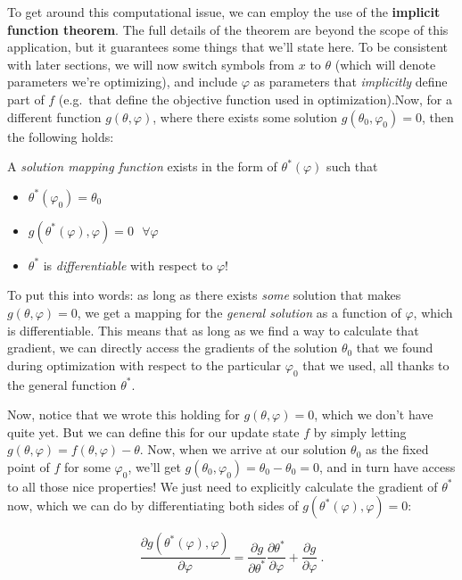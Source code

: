 \documentclass[
  11pt,
  numbers=noendperiod]{book}
\providecommand{\tightlist}{%
  \setlength{\itemsep}{0pt}\setlength{\parskip}{0pt}}\usepackage{longtable,booktabs,array}
\begin{document}
To get around this computational issue, we can employ the use of the
\textbf{implicit function theorem}. The full details of the theorem are
beyond the scope of this application, but it guarantees some things that
we'll state here. To be consistent with later sections, we will now
switch symbols from \(x\) to \(\theta\) (which will denote parameters
we're optimizing), and include \(\varphi\) as parameters that
\emph{implicitly} define part of \(f\) (e.g.~that define the objective
function used in optimization).Now, for a different function
\(g(\theta, \varphi)\), where there exists some solution
\(g(\theta_0, \varphi_0) = 0\), then the following holds:

A \emph{solution mapping function} exists in the form of
\(\theta^*(\varphi)\) such that

\begin{itemize}
\tightlist
\item
  \(\theta^*(\varphi_0) = \theta_0\)
\item
  \(g(\theta^*(\varphi), \varphi) =0~~~\forall \varphi\)
\item
  \(\theta^*\) is \emph{differentiable} with respect to \(\varphi\)!
\end{itemize}

To put this into words: as long as there exists \emph{some} solution
that makes \(g(\theta, \varphi) = 0\), we get a mapping for the
\emph{general solution} as a function of \(\varphi\), which is
differentiable. This means that as long as we find a way to calculate
that gradient, we can directly access the gradients of the solution
\(\theta_0\) that we found during optimization with respect to the
particular \(\varphi_0\) that we used, all thanks to the general
function \(\theta^*\).

Now, notice that we wrote this holding for \(g(\theta, \varphi) = 0\),
which we don't have quite yet. But we can define this for our update
state \(f\) by simply letting
\(g(\theta, \varphi) = f(\theta, \varphi) - \theta\). Now, when we
arrive at our solution \(\theta_0\) as the fixed point of \(f\) for some
\(\varphi_0\), we'll get
\(g(\theta_0, \varphi_0) = \theta_0 - \theta_0 = 0\), and in turn have
access to all those nice properties! We just need to explicitly
calculate the gradient of \(\theta^*\) now, which we can do by
differentiating both sides of \(g(\theta^*(\varphi), \varphi) =0\):

\[
\frac{\partial g(\theta^*(\varphi), \varphi)}{\partial\varphi} = \frac{\partial g}{\partial \theta^*}\frac{\partial \theta^*}{\partial \varphi} + \frac{\partial g}{\partial\varphi}~.
\]
\end{document}
